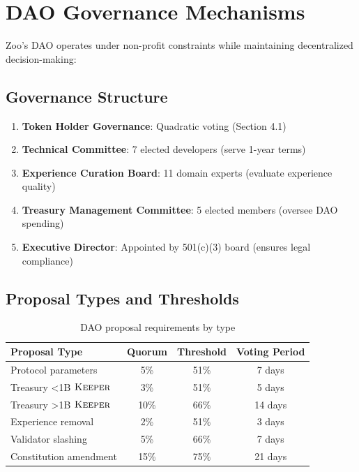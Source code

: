 \section{DAO Governance Mechanisms}


Zoo's DAO operates under non-profit constraints while maintaining decentralized decision-making:

\subsection{Governance Structure}

\begin{enumerate}
\item \textbf{Token Holder Governance}: Quadratic voting (Section 4.1)
\item \textbf{Technical Committee}: 7 elected developers (serve 1-year terms)
\item \textbf{Experience Curation Board}: 11 domain experts (evaluate experience quality)
\item \textbf{Treasury Management Committee}: 5 elected members (oversee DAO spending)
\item \textbf{Executive Director}: Appointed by 501(c)(3) board (ensures legal compliance)
\end{enumerate}

\subsection{Proposal Types and Thresholds}

\begin{table}[h]
\centering
\begin{tabular}{lccc}
\toprule
\textbf{Proposal Type} & \textbf{Quorum} & \textbf{Threshold} & \textbf{Voting Period} \\
\midrule
Protocol parameters & 5\% & 51\% & 7 days \\
Treasury <1B $\textsc{Keeper}$ & 3\% & 51\% & 5 days \\
Treasury >1B $\textsc{Keeper}$ & 10\% & 66\% & 14 days \\
Experience removal & 2\% & 51\% & 3 days \\
Validator slashing & 5\% & 66\% & 7 days \\
Constitution amendment & 15\% & 75\% & 21 days \\
\bottomrule
\end{tabular}
\caption{DAO proposal requirements by type}
\label{tab:dao_proposals}
\end{table}

